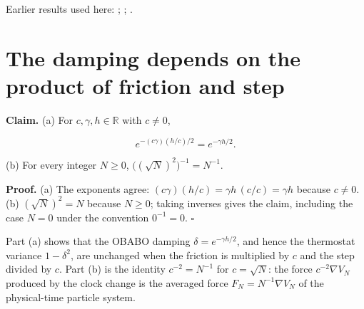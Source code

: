 \documentclass[11pt,a4paper]{article}
\begin{document}
Earlier results used here: \cite[Section~3.10.1]{LangevinLean2026Kinetic}; \cite[Section~3.10.3]{LangevinLean2026Kinetic}; \cite[Section~3.12.2]{LangevinLean2026Kinetic}.

\section{\texorpdfstring{The damping depends on the product of friction and step}{The damping depends on the product of friction and step}}


\textbf{Claim.} (a) For \(c,\gamma,h\in\mathbb R\) with \(c\ne0\),


\[e^{-(c\gamma)(h/c)/2}=e^{-\gamma h/2}.\]


(b) For every integer \(N\ge0\), \(\bigl((\sqrt N)^2\bigr)^{-1}=N^{-1}\).




\textbf{Proof.} (a) The exponents agree: \((c\gamma)(h/c)=\gamma h\,(c/c)=\gamma h\) because \(c\ne0\). (b) \((\sqrt N)^2=N\) because \(N\ge0\); taking inverses gives the claim, including the case \(N=0\) under the convention \(0^{-1}=0\). \(\square\)




Part (a) shows that the OBABO damping \(\delta=e^{-\gamma h/2}\), and hence the thermostat variance \(1-\delta^2\), are unchanged when the friction is multiplied by \(c\) and the step divided by \(c\). Part (b) is the identity \(c^{-2}=N^{-1}\) for \(c=\sqrt N\): the force \(c^{-2}\nabla V_N\) produced by the clock change is the averaged force \(F_N=N^{-1}\nabla V_N\) of the physical-time particle system.
\end{document}
